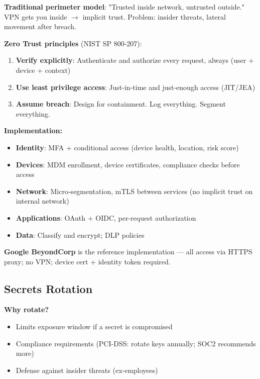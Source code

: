\documentclass[11pt]{article}
\providecommand{\tightlist}{\setlength{\itemsep}{1pt}\setlength{\parskip}{0pt}}
\begin{document}
\textbf{Traditional perimeter model}: "Trusted inside network, untrusted outside." VPN gets you inside \(\rightarrow\) implicit trust. Problem: insider threats, lateral movement after breach.

\textbf{Zero Trust principles} (NIST SP 800-207):

\begin{enumerate}
\def\labelenumi{\arabic{enumi}.}
\tightlist
\item
  \textbf{Verify explicitly}: Authenticate and authorize every request, always (user + device + context)
\item
  \textbf{Use least privilege access}: Just-in-time and just-enough access (JIT/JEA)
\item
  \textbf{Assume breach}: Design for containment. Log everything. Segment everything.
\end{enumerate}

\textbf{Implementation:}

\begin{itemize}
\tightlist
\item
  \textbf{Identity}: MFA + conditional access (device health, location, risk score)
\item
  \textbf{Devices}: MDM enrollment, device certificates, compliance checks before access
\item
  \textbf{Network}: Micro-segmentation, mTLS between services (no implicit trust on internal network)
\item
  \textbf{Applications}: OAuth + OIDC, per-request authorization
\item
  \textbf{Data}: Classify and encrypt; DLP policies
\end{itemize}

\textbf{Google BeyondCorp} is the reference implementation --- all access via HTTPS proxy; no VPN; device cert + identity token required.

\subsection{Secrets Rotation}\label{secrets-rotation}

\textbf{Why rotate?}

\begin{itemize}
\tightlist
\item
  Limits exposure window if a secret is compromised
\item
  Compliance requirements (PCI-DSS: rotate keys annually; SOC2 recommends more)
\item
  Defense against insider threats (ex-employees)
\end{itemize}
\end{document}
